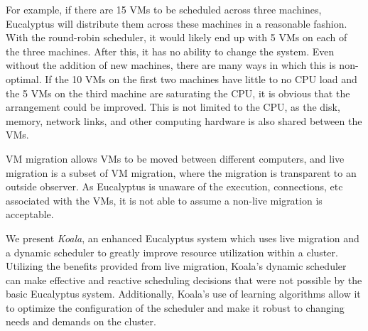 For example, if there are 15 VMs to be scheduled across three machines, Eucalyptus will distribute them across these machines in a reasonable fashion.  With the round-robin scheduler, it would likely end up with 5 VMs on each of the three machines.  After this, it has no ability to change the system.  Even without the addition of new machines, there are many ways in which this is non-optimal.  If the 10 VMs on the first two machines have little to no CPU load and the 5 VMs on the third machine are saturating the CPU, it is obvious that the arrangement could be improved.  This is not limited to the CPU, as the disk, memory, network links, and other computing hardware is also shared between the VMs.

VM migration allows VMs to be moved between different computers, and live migration is a subset of VM migration, where the migration is transparent to an outside observer.  As Eucalyptus is unaware of the execution, connections, etc associated with the VMs, it is not able to assume a non-live migration is acceptable.

We present \emph{Koala}, an enhanced Eucalyptus system which uses live migration and a dynamic scheduler to greatly improve resource utilization within a cluster.  Utilizing the benefits provided from live migration, Koala's dynamic scheduler can make effective and reactive scheduling decisions that were not possible by the basic Eucalyptus system.  Additionally, Koala's use of learning algorithms allow it to optimize the configuration of the scheduler and make it robust to changing needs and demands on the cluster.


  
